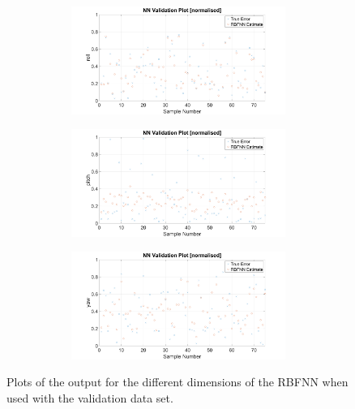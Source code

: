 \begin{figure}
\begin{subfigure}{0.48\textwidth}
\begin{subfigure}{\textwidth}
    \end{subfigure}
    \caption{}
  \end{subfigure}
  \begin{subfigure}{0.48\textwidth}
    \begin{subfigure}{\textwidth}
      \includegraphics[clip, trim = 100 0 100 0, width=\textwidth]{figures/chapter4/scatter_v_roll}
    \end{subfigure}
    \begin{subfigure}{\textwidth}
      \includegraphics[clip, trim = 100 0 100 0, width=\textwidth]{figures/chapter4/scatter_v_pitch}
    \end{subfigure}
    \begin{subfigure}{\textwidth}
      \includegraphics[clip, trim = 100 0 100 0, width=\textwidth]{figures/chapter4/scatter_v_yaw}
    \end{subfigure}
    \caption{}
  \end{subfigure}
  \caption[The output of the RBFNN with the validation set input.]{Plots of the output for the different dimensions of the RBFNN when used with the validation data set.}
  \label{fig:chap4-rbf-valid}
\end{figure}

